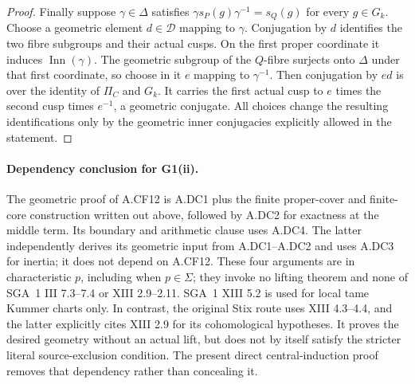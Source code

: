\begin{proof}
Finally suppose $\gamma\in\Delta$ satisfies
$\gamma s_P(g)\gamma^{-1}=s_Q(g)$ for every $g\in G_k$.
Choose a geometric element $d\in\mathcal D$ mapping to $\gamma$.
Conjugation by $d$ identifies the two fibre subgroups and their actual
cusps. On the first proper coordinate it induces
$\operatorname{Inn}(\gamma)$. The geometric subgroup of the $Q$-fibre
surjects onto $\Delta$ under that first coordinate, so choose in it
$e$ mapping to $\gamma^{-1}$. Then conjugation by $ed$ is over the
identity of $\Pi_C$ and $G_k$. It carries the first actual cusp to
$e$ times the second cusp times $e^{-1}$, a geometric conjugate.
All choices change the resulting identifications only by the geometric
inner conjugacies explicitly allowed in the statement.
\end{proof}

\paragraph{Dependency conclusion for G1(ii).}
The geometric proof of A.CF12 is A.DC1 plus the finite proper-cover
and finite-core construction written out above, followed by A.DC2
for exactness at the middle term. Its boundary and arithmetic clause
uses A.DC4. The latter independently derives its geometric input
from A.DC1--A.DC2 and uses A.DC3 for inertia; it does not depend on
A.CF12. These four arguments are in characteristic $p$,
including when $p\in\Sigma$; they invoke no lifting theorem and none
of SGA~1 III 7.3--7.4 or XIII 2.9--2.11. SGA~1 XIII 5.2 is used for
local tame Kummer charts only. In contrast, the original Stix route
uses XIII 4.3--4.4, and the latter explicitly cites XIII 2.9 for its
cohomological hypotheses. It proves the desired geometry without an
actual lift, but does not by itself satisfy the stricter literal
source-exclusion condition. The present direct central-induction proof
removes that dependency rather than concealing it.
